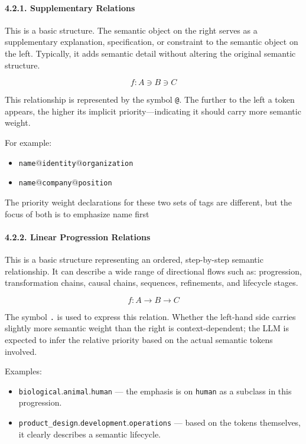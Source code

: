 \documentclass[conference]{IEEEtran}
\begin{document}
\paragraph{4.2.1. Supplementary
Relations}\label{421-supplementary-relations}

This is a basic structure. The semantic object on the right serves as a
supplementary explanation, specification, or constraint to the semantic
object on the left. Typically, it adds semantic detail without altering
the original semantic structure.

\[ f : A \ni B \ni C \]

This relationship is represented by the symbol \texttt{@}. The further
to the left a token appears, the higher its implicit
priority---indicating it should carry more semantic weight.

For example:

\begin{itemize}
\item
  \texttt{name}@\texttt{identity}@\texttt{organization}
\item
  \texttt{name}@\texttt{company}@\texttt{position}
\end{itemize}

The priority weight declarations for these two sets of tags are
different, but the focus of both is to emphasize
\textquotesingle name\textquotesingle{} first

\paragraph{4.2.2. Linear Progression
Relations}\label{422-linear-progression-relations}

This is a basic structure representing an ordered, step-by-step semantic
relationship. It can describe a wide range of directional flows such as:
progression, transformation chains, causal chains, sequences,
refinements, and lifecycle stages.

\[f: A \rightarrow B \rightarrow C\]

The symbol \texttt{.} is used to express this relation. Whether the
left-hand side carries slightly more semantic weight than the right is
context-dependent; the LLM is expected to infer the relative priority
based on the actual semantic tokens involved.

Examples:

\begin{itemize}
\item
  \texttt{biological}.\texttt{animal}.\texttt{human} --- the emphasis is
  on \texttt{human} as a subclass in this progression.
\item
  \texttt{product\_design}.\texttt{development}.\texttt{operations} ---
  based on the tokens themselves, it clearly describes a semantic
  lifecycle.
\end{itemize}
\end{document}
